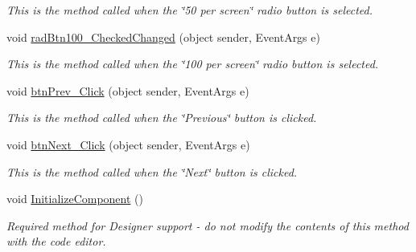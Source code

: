 \begin{DoxyCompactItemize}
\begin{DoxyCompactList}\small\item\em This is the method called when the \char`\"{}50 per screen\char`\"{} radio button is selected. \end{DoxyCompactList}\item 
void \hyperlink{class_price_comparison_form_1_1_form_price_compare_a50cc853ee118508b1621b6b1c7fda1c2}{rad\-Btn100\-\_\-\-Checked\-Changed} (object sender, Event\-Args e)
\begin{DoxyCompactList}\small\item\em This is the method called when the \char`\"{}100 per screen\char`\"{} radio button is selected. \end{DoxyCompactList}\item 
void \hyperlink{class_price_comparison_form_1_1_form_price_compare_a96ca09426ee44bc1ddf3b2640d190329}{btn\-Prev\-\_\-\-Click} (object sender, Event\-Args e)
\begin{DoxyCompactList}\small\item\em This is the method called when the \char`\"{}\-Previous\char`\"{} button is clicked. \end{DoxyCompactList}\item 
void \hyperlink{class_price_comparison_form_1_1_form_price_compare_a7bb0480436b3e05bcc8b76fa9d65af0d}{btn\-Next\-\_\-\-Click} (object sender, Event\-Args e)
\begin{DoxyCompactList}\small\item\em This is the method called when the \char`\"{}\-Next\char`\"{} button is clicked. \end{DoxyCompactList}\item 
void \hyperlink{class_price_comparison_form_1_1_form_price_compare_af10164cb3dc5a27359e540e27505629f}{Initialize\-Component} ()
\begin{DoxyCompactList}\small\item\em Required method for Designer support -\/ do not modify the contents of this method with the code editor. \end{DoxyCompactList}\end{DoxyCompactItemize}
